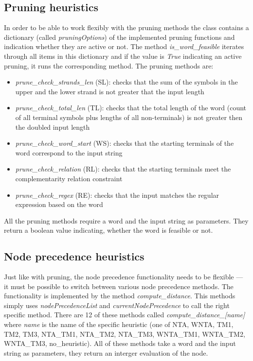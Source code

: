 \subsection{Pruning heuristics}
In order to be able to work flexibly with the pruning methods the class contains a dictionary (called \textit{pruningOptions}) of the implemented pruning functions and indication whether they are active or not. The method \textit{is\_word\_feasible} iterates through all items in this dictionary and if the value is \textit{True} indicating an active pruning, it runs the corresponding method.
The pruning methods are:
\begin{itemize}
  \item{\textit{prune\_check\_strands\_len} (SL): checks that the sum of the symbols in the upper and the lower strand is not greater that the input length}

  \item{\textit{prune\_check\_total\_len} (TL): checks that the total length of the word (count of all terminal symbols plus lengths of all non-terminals) is not greater then the doubled input length}

  \item{\textit{prune\_check\_word\_start} (WS): checks that the starting terminals of the word correspond to the input string}

  \item{\textit{prune\_check\_relation} (RL): checks that the starting terminals meet the complementarity relation constraint}

  \item{\textit{prune\_check\_regex} (RE): checks that the input matches the regular expression based on the word}
\end{itemize}

All the pruning methods require a word and the input string as parameters. They return a boolean value indicating, whether the word is feasible or not.

\subsection{Node precedence heuristics}
Just like with pruning, the node precedence functionality needs to be flexible --- it must be possible to switch between various node precedence methods. The functionality is implemented by the method \textit{compute\_distance}. This methods simply uses \textit{nodePrecedenceList} and \textit{currentNodePrecedence} to call the right specific method.
There are 12 of these methods called \textit{compute\_distance\_[name]} where \textit{name} is the name of the specific heuristic (one of NTA, WNTA, TM1, TM2, TM3, NTA\_TM1, NTA\_TM2, NTA\_TM3, WNTA\_TM1, WNTA\_TM2, WNTA\_TM3, no\_heuristic). All of these methods take a word and the input string as parameters, they return an interger evaluation of the node.


